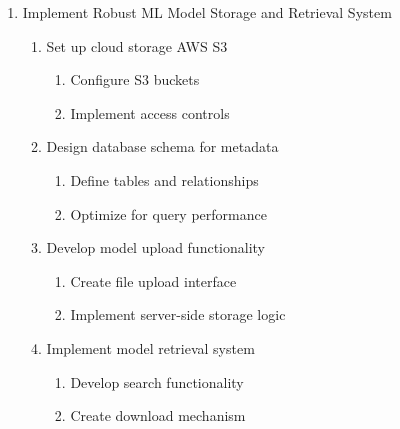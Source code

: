 \documentclass[12pt]{article}
\begin{document}
\begin{enumerate}
    \item Implement Robust ML Model Storage and Retrieval System
    \begin{enumerate}
        \item Set up cloud storage  AWS S3
        \begin{enumerate}
            \item Configure S3 buckets
            \item Implement access controls
        \end{enumerate}
        \item Design database schema for metadata
        \begin{enumerate}
            \item Define tables and relationships
            \item Optimize for query performance
        \end{enumerate}
        \item Develop model upload functionality
        \begin{enumerate}
            \item Create file upload interface
            \item Implement server-side storage logic
        \end{enumerate}
        \item Implement model retrieval system
        \begin{enumerate}
            \item Develop search functionality
            \item Create download mechanism
        \end{enumerate}
    \end{enumerate}


\end{enumerate}
\end{document}
